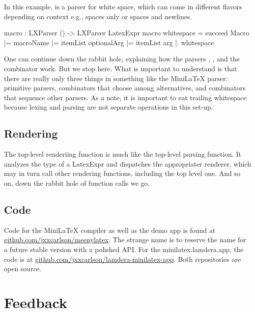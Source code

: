 In this example,  is a parser for white space, which can come in different flavors depending on context e.g., spaces only or spaces and newlines.

\begin{listing}
macro : LXParser () -> LXParser LatexExpr
macro whitespace =
    succeed Macro
        |= macroName
        |= itemList optionalArg
        |= itemList arg
        |. whitespace
\end{listing}

One can continue down the rabbit hole, explaining how the parsers , ,   and the combinator  work.  But we stop here.  What is important to understand is that there are really only three things in something like the MiniLaTeX parser: primitive parsers, combinators that choose among alternatives, and combinators that sequence other parsers. As a note, it is important to eat trailing whitespace because lexing and parsing are not separate operations in this set-up.

\subsection{Rendering}


The top-level renderiing function is much like the top-level parsing function. It analyzes the type of a LatexExpr and dispatches the appropriater renderer, which may in turn call other rendering functions, including the top level one. And so on, down the rabbit hole of function calls we go.


\subsection{Code}

Code for the MiniLaTeX compiler as well as the demo app is found at \href{https://github.com/jxxcarlson/meenylatex}{github.com/jxxcarlson/meenylatex}.  The strange name is to reserve the name  for a future stable version with a polished API.   For the minilatex.lamdera.app, the code is at \href{https://github.com/jxxcarlson/lamdera-minilatex-app}{github.com/jxxcarlson/lamdera-minilatex-app}.
Both repositories are open source.

\section{Feedback}

